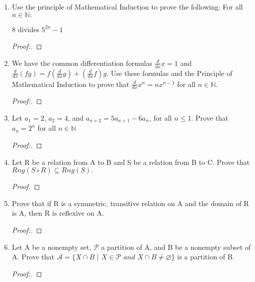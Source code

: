 \documentclass[11pt]{article}
\begin{document}
\begin{enumerate}
    \item Use the principle of Mathematical Induction to prove the following: For all $n \in \mathbb{N}:$
    \begin{center}
        8 divides $5^{2n} -1$
    \end{center}
        \begin{proof}[Proof:\nopunct]
        \end{proof}
        
    \item We have the common differentiation formulas $\frac{d}{dx} x=1$ and $\frac{d}{dx}(fg)=f(\frac{d}{dx}g) + (\frac{d}{dx}f)g$. 
    \newline Use these formulas and the Principle of Mathematical Induction to prove that $\frac{d}{dx}x^n = nx^{n-1}$ for all $n \in \mathbb{N}$.
        \begin{proof}[Proof:\nopunct]
        \end{proof}
        
    \item Let $a_1=2$, $a_2=4$, and $a_{n+2} = 5a_{n+1} - 6a_n$, for all $n \leq 1.$ Prove that $a_n = 2^n$ for all $n \in \mathbb{N}$
        \begin{proof}[Proof:\nopunct]
        \end{proof}
        
    \item Let R be a relation from A to B and S be a relation from B to C. \newline
    Prove that $Rng(S\circ R) \subseteq Rng(S).$
        \begin{proof}
        \end{proof}
        
    \item Prove that if R is a symmetric, transitive relation on A and the domain of R is A, then R is reflexive on A. 
     \begin{proof}[Proof:\nopunct]
        \end{proof}
        
    \item Let A be a nonempty set, $\mathscr{P}$ a partition of A, and B be a nonempty subset of A. \newline Prove that $\mathscr{A}=\{X \cap B$ $|$ $X \in \mathscr{P}$ $and$ $X \cap B \neq \varnothing \}$ is a partition of B.
        \begin{proof}[Proof:\nopunct]
        \end{proof}
        

\end{enumerate}
\end{document}
